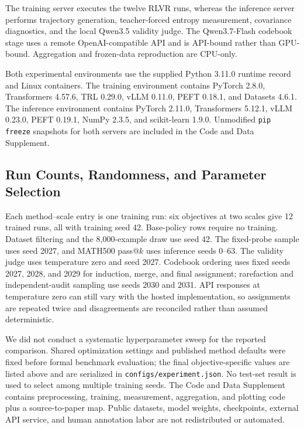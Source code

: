 \documentclass[letterpaper]{article}
\begin{document}
The training server executes the twelve RLVR runs, whereas the inference
server performs trajectory generation, teacher-forced entropy measurement,
covariance diagnostics, and the local Qwen3.5 validity judge.  The
Qwen3.7-Flash codebook stage uses a remote OpenAI-compatible API and is
API-bound rather than GPU-bound.  Aggregation and frozen-data reproduction
are CPU-only.

Both experimental environments use the supplied Python 3.11.0 runtime record
and Linux containers.  The training environment contains PyTorch 2.8.0,
Transformers 4.57.6, TRL 0.29.0, vLLM 0.11.0, PEFT 0.18.1, and Datasets
4.6.1.  The inference environment contains PyTorch 2.11.0, Transformers
5.12.1, vLLM 0.23.0, PEFT 0.19.1, NumPy 2.3.5, and scikit-learn 1.9.0.
Unmodified \texttt{pip freeze} snapshots for both servers are included in
the Code and Data Supplement. 

\subsection{Run Counts, Randomness, and Parameter Selection}

Each method--scale entry is one training run: six objectives at two scales
give 12 trained runs, all with training seed 42.  Base-policy rows require no
training.  Dataset filtering and the 8,000-example draw use seed 42.  The
fixed-probe sample uses seed 2027, and MATH500 pass@\(k\) uses inference
seeds 0--63.  The validity judge uses temperature zero and seed 2027.
Codebook ordering uses fixed seeds 2027, 2028, and 2029 for induction, merge,
and final assignment; rarefaction and independent-audit sampling use seeds
2030 and 2031.  API responses at temperature zero can still vary with the
hosted implementation, so assignments are repeated twice and disagreements
are reconciled rather than assumed deterministic.

We did not conduct a systematic hyperparameter sweep for the reported
comparison.  Shared optimization settings and published method defaults were
fixed before formal benchmark evaluation; the final objective-specific
values are listed above and are serialized in
\texttt{configs/experiment.json}.  No test-set result is used to select among
multiple training seeds.  The Code and Data Supplement contains preprocessing,
training, measurement, aggregation, and plotting code plus a source-to-paper
map.  Public datasets, model weights, checkpoints, external API service, and
human annotation labor are not redistributed or automated.
\end{document}
